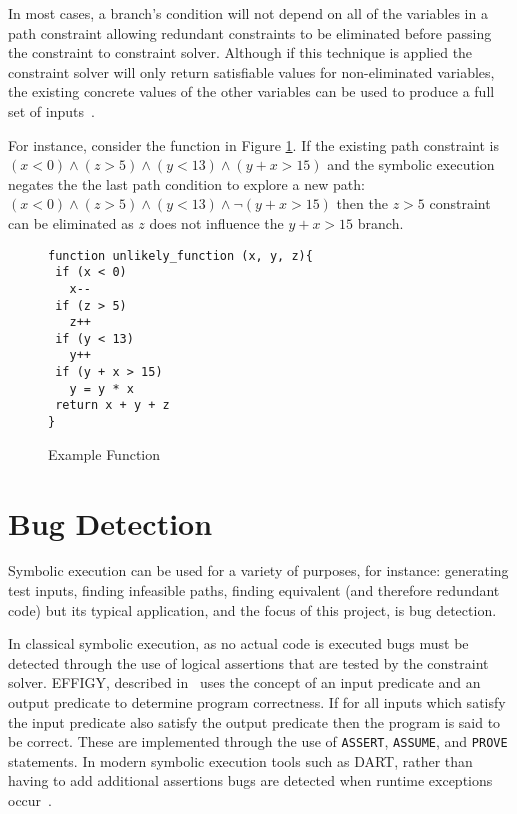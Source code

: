 \documentclass[]{final_report}
\begin{document}
In most cases, a branch's condition will not depend on all of the variables in a path constraint allowing redundant constraints to be eliminated before passing the constraint to constraint solver. Although if this technique is applied the constraint solver will only return satisfiable values for non-eliminated variables, the existing concrete values of the other variables can be used to produce a full set of inputs~\cite{cadar2013symbolic}.

For instance, consider the function in Figure \ref{fig:example-function}. If the existing path constraint is $(x < 0 ) \land ( z > 5) \land (y < 13) \land (y + x > 15) $ and the symbolic execution negates the the last path condition to explore a new path: $ (x < 0) \land (z > 5) \land (y < 13) \land \lnot(y + x > 15)$ then the $z > 5$ constraint can be eliminated as $z$ does not influence the $y + x > 15$ branch.

\begin{figure}[h]
\begin{verbatim}
function unlikely_function (x, y, z){
 if (x < 0)
   x--
 if (z > 5)
   z++
 if (y < 13)
   y++
 if (y + x > 15)
   y = y * x
 return x + y + z
}
\end{verbatim}
\caption{\label{fig:example-function} Example Function}
\end{figure} 

\section{Bug Detection}

Symbolic execution can be used for a variety of purposes, for instance: generating test inputs, finding infeasible paths, finding equivalent (and therefore redundant code) but its typical application, and the focus of this project, is bug detection. 

In classical symbolic execution, as no actual code is executed bugs must be detected through the use of logical assertions that are tested by the constraint solver. EFFIGY, described in~\cite{king1976symbolic} uses the concept of an input predicate and an output predicate to determine program correctness. If for all inputs which satisfy the input predicate also satisfy the output predicate then the program is said to be correct. These are implemented through the use of \lstinline{ASSERT}, \lstinline{ASSUME}, and \lstinline{PROVE} statements. In modern symbolic execution tools such as DART, rather than having to add additional assertions bugs are detected when runtime exceptions occur~\cite{godefroid2005dart}.
\end{document}
